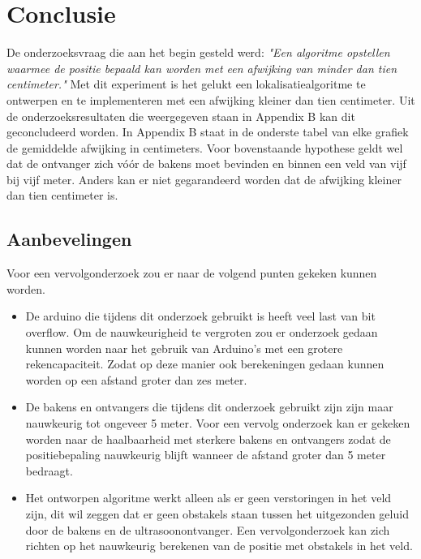 \documentclass{article}
\begin{document}
\section{Conclusie}
De onderzoeksvraag die aan het begin gesteld werd: \textit{"Een algoritme opstellen waarmee de positie bepaald kan worden met een afwijking van minder dan tien centimeter."} Met dit experiment is het gelukt een lokalisatiealgoritme te ontwerpen en te implementeren met een afwijking kleiner dan tien centimeter. Uit de onderzoeksresultaten die weergegeven staan in Appendix B kan dit geconcludeerd worden. In Appendix B staat in de onderste tabel van elke grafiek de gemiddelde afwijking in centimeters. Voor bovenstaande hypothese geldt wel dat de ontvanger zich v\'{o}\'{o}r de bakens moet bevinden en binnen een veld van vijf bij vijf meter. Anders kan er niet gegarandeerd worden dat de afwijking kleiner dan tien centimeter is. 

\subsection{Aanbevelingen} 
 Voor een vervolgonderzoek zou er naar de volgend punten gekeken kunnen worden.
 \begin{itemize}
 	\item De arduino die tijdens dit onderzoek gebruikt is heeft veel last van bit overflow. Om de nauwkeurigheid te vergroten zou er onderzoek gedaan kunnen worden naar het gebruik van Arduino's met een grotere rekencapaciteit. Zodat op deze manier ook berekeningen gedaan kunnen worden op een afstand groter dan zes meter. 
 	\item De bakens en ontvangers die tijdens dit onderzoek gebruikt zijn zijn maar nauwkeurig tot ongeveer 5 meter. Voor een vervolg onderzoek kan er gekeken worden naar de haalbaarheid met sterkere bakens en ontvangers zodat de positiebepaling nauwkeurig blijft wanneer de afstand groter dan 5 meter bedraagt. 
 	\item Het ontworpen algoritme werkt alleen als er geen verstoringen in het veld zijn, dit wil zeggen dat er geen obstakels staan tussen het uitgezonden geluid door de bakens en de ultrasoonontvanger. Een vervolgonderzoek kan zich richten op het nauwkeurig berekenen van de positie met obstakels in het veld.  
 \end{itemize}
\newpage



\newpage
\appendix
{}
\end{document}
